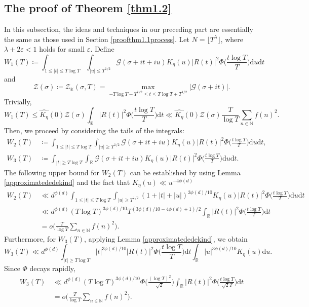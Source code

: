 \documentclass[12pt,reqno]{amsart}
\theoremstyle{definition}
\numberwithin{equation}{section}
\newcommand{\mbk}{\mathbb{K}}
\newcommand{\mbr}{\mathbb{R}}
\newcommand{\mbn}{\mathbb{N}}
\newcommand{\mcg}{\mathcal{G}}
\newcommand{\mcz}{\mathcal{Z}}
\begin{document}
\subsection{The proof of Theorem \ref{thm1.2}}
\label{proofthm1.2process}
In this subsection, the ideas and techniques in our preceding part are essentially the same as those used in Section \ref{proofthm1.1process}. Let $N=\lfloor T^\lambda \rfloor$, where $\lambda + 2 \varepsilon < 1$ holds for small $\varepsilon$. Define 
$$
W_1(T) \coloneqq \int_{1\le |t| \le T \log T}\int_{ |u| \le T^{1/2}}\mcg(\sigma + it + iu)K_{\eta}(u)|R(t)|^{2}\Phi\Big(\frac{t\log T}{T}\Big)\mathrm{d}u\mathrm{d}t
$$
and
$$
\mcz(\sigma) \coloneqq \mcz_\mbk(\sigma,T) =  \max_{-T \log T - T^{1/2}\le t\le T \log T+T^{1/2}}|\mcg(\sigma+it)|.
$$
Trivially,
$$
    W_1(T) \le
    \widehat{K_{\eta}}(0)\mcz(\sigma) \int_\mbr |R(t)|^{2}\Phi\Big(\frac{t\log T}{T}\Big)\mathrm{d}t  \ll \widehat{K_{\eta}}(0)\mcz(\sigma)\frac{T}{\log T}\sum_{n \in \mbn} f(n)^2.
$$
Then, we proceed by considering the tails of the integrals:
\begin{align*}
    W_2(T) &\, \coloneqq\int_{1\le |t| \le T \log T}\int_{|u| \ge T^{1/2}}\mcg(\sigma+it+iu)K_{\eta}(u)|R(t)|^{2}\Phi\Big(\frac{t\log T}{T}\Big)\mathrm{d}u\mathrm{d}t, \\
    W_3(T) &\, \coloneqq\int_{|t| \ge T \log T}\int_\mbr\mcg(\sigma + it + iu)K_{\eta}(u)|R(t)|^{2}\Phi\Big(\frac{t\log T}{T}\Big)\mathrm{d}u\mathrm{d}t.
\end{align*}
The following upper bound for $W_2(T)$ can be established by using Lemma \ref{approximatededekind} and the fact that $K_{\eta}(u) \ll u^{-4\phi(d)}$
\begin{align}
\label{W2Tupperbound}
    W_2(T) &\, \ll d^{\phi(d)} \int_{1\le |t| \le T \log T}\int_{|u| \ge T^{1/2}} (1 + |t| + |u|)^{3\phi(d)/10} K_{\eta}(u)|R(t)|^{2}\Phi\Big(\frac{t\log T}{T}\Big)\mathrm{d}u\mathrm{d}t  \nonumber \\    
    &\, \ll d^{\phi(d)}(T\log T)^{3\phi(d)/10} T^{(3\phi(d)/10 - 4\phi(d)+1)/2} \int_\mbr|R(t)|^{2}\Phi\Big(\frac{t\log T}{T}\Big)\mathrm{d}t \nonumber \\
    &\, = o\Big(\frac{T}{\log T} \sum_{n \in \mbn} f(n)^2\Big).
\end{align}
Furthermore, for $W_3(T)$, applying Lemma \ref{approximatededekind}, we obtain
$$
W_3(T) \ll d^{\phi(d)} \int_{|t| \ge T\log T}|t|^{3\phi(d)/10}|R(t)|^{2}\Phi\Big(\frac{t\log T}{T}\Big)\mathrm{d}t \int_\mbr |u|^{3\phi(d)/10} K_{\eta}(u)\mathrm{d}u.
$$
Since $\Phi$ decays rapidly, 
\begin{align}
\label{W3Tupperbound}
    W_3(T) &\, \ll d^{\phi(d)} (T\log T)^{3\phi(d)/10} \Phi \Big(\frac{(\log T)^2}{\sqrt{2}}\Big) \int_\mbr |R(t)|^{2} \Phi \Big(\frac{t\log T}{\sqrt{2}T}\Big)\mathrm{d}t \nonumber \\
    & \, = o \Big(\frac{T}{\log T} \sum_{n \in \mbn} f(n)^2\Big).
\end{align}
\end{document}
